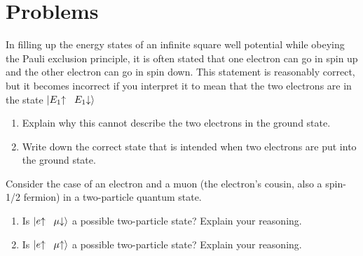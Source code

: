 \vfill

\newpage

\section*{Problems}
\label{sec:quantum_statistics_problems}

\begin{problem}
  In filling up the energy states of an infinite square well potential
  while obeying the Pauli
  exclusion principle, it is often stated that one
  electron can go in spin up and the other electron can go in spin
  down.  This statement is reasonably correct, but it becomes incorrect
  if you interpret it to mean that the two electrons are in the state
  $|E_1\hspace{-1mm}\uparrow \hspace{2mm} E_1\hspace{-1mm}\downarrow\rangle$
  \begin{enumerate}
  \item Explain why this cannot describe the two electrons in the
    ground state.
  \item Write down the correct state that is intended when two
    electrons are put into the ground state.
  \end{enumerate}
\end{problem}

\begin{problem}
  Consider the case of an electron and a muon (the electron's cousin,
  also a spin-1/2 fermion) in a two-particle quantum state.
  \begin{enumerate}
  \item Is $|e\hspace{-1mm}\uparrow\hspace{2mm} \mu\hspace{-1mm}\downarrow\rangle$ a possible
    two-particle state?  Explain your reasoning.
  \item Is $|e\hspace{-1mm}\uparrow\hspace{2mm} \mu\hspace{-1mm}\uparrow\rangle$ a possible
    two-particle state?  Explain your reasoning.
  \end{enumerate}
\end{problem}

